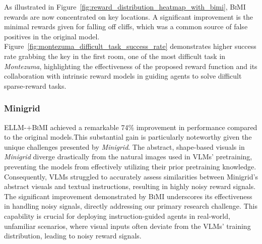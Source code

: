 \documentclass{article}
\theoremstyle{plain}
\theoremstyle{definition}
\theoremstyle{remark}
\begin{document}
As illustrated in Figure~\ref{fig:reward_distribution_heatmap_with_bimi}, \textsc{BiMI} rewards are now concentrated on key locations. A significant improvement is the minimal rewards given for falling off cliffs, which was a common source of false positives in the original model. Figure~\ref{fig:montezuma_difficult_task_success_rate} demonstrates higher success rate grabbing the key in the first room, one of the most difficult task in \emph{Montezuma}, highlighting the effectiveness of the proposed reward function and its collaboration with intrinsic reward models in guiding agents to solve difficult sparse-reward tasks.


\subsubsection{Minigrid}
\label{subsec:main_results_minigrid}
ELLM-$+$\textsc{BiMI} achieved a remarkable 74\% improvement in performance compared to the original models.This substantial gain is particularly noteworthy given the unique challenges presented by \emph{Minigrid}. The abstract, shape-based visuals in \emph{Minigrid} diverge drastically from the natural images used in VLMs' pretraining, preventing the models from effectively utilizing their prior pretraining knowledge. Consequently, VLMs struggled to accurately assess similarities between Minigrid's abstract visuals and textual instructions, resulting in highly noisy reward signals. The significant improvement demonstrated by \textsc{BiMI} underscores its effectiveness in handling noisy signals, directly addressing our primary research challenge. This capability is crucial for deploying instruction-guided agents in real-world, unfamiliar scenarios, where visual inputs often deviate from the VLMs' training distribution, leading to noisy reward signals.
\end{document}
